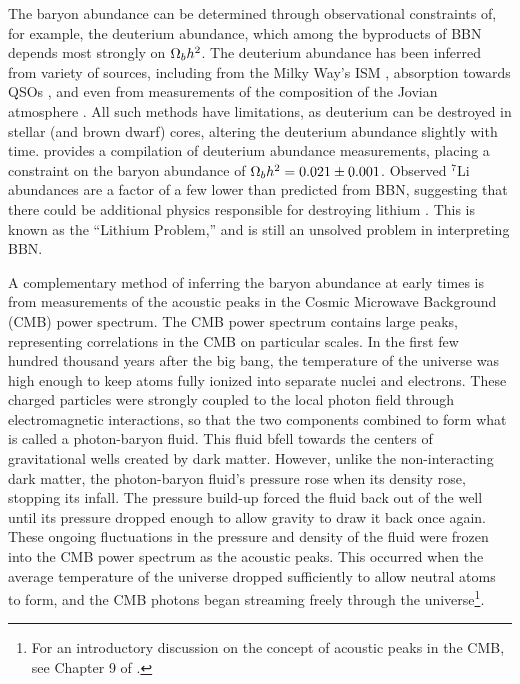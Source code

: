 

The baryon abundance can be determined through observational
constraints of, for example, the deuterium abundance, which among the
byproducts of BBN depends most strongly on $\Omega_b h^2$. The
deuterium abundance has been inferred from variety of sources,
including from the Milky Way's ISM \citep{Linsky1993, Linsky1995},
absorption towards QSOs \citep{Tytler1996, Kirkman2003}, and even from
measurements of the composition of the Jovian atmosphere
\citep{Niemann1996}. All such methods have limitations, as deuterium
can be destroyed in stellar (and brown dwarf) cores, altering the
deuterium abundance slightly with time. \citet{Iocco2009} provides a
compilation of deuterium abundance measurements, placing a
constraint on the baryon abundance of $\Omega_b h^2 = 0.021 \pm
0.001$. Observed $^7$Li abundances are a factor of a few lower than
predicted from BBN, suggesting that there could be additional physics
responsible for destroying lithium \citep{Suzuki2000,
  Melendez2004}. This is known as the ``Lithium Problem,'' and is
still an unsolved problem in interpreting BBN.

A complementary method of inferring the baryon abundance at early
times is from measurements of the acoustic peaks in the Cosmic
Microwave Background (CMB) power spectrum. The CMB power spectrum
contains large peaks, representing correlations in the CMB on
particular scales. In the first few hundred thousand years after the
big bang, the temperature of the universe was high enough to keep
atoms fully ionized into separate nuclei and electrons. These charged
particles were strongly coupled to the local photon field through
electromagnetic interactions, so that the two components combined to
form what is called a photon-baryon fluid. This fluid bfell towards the
centers of gravitational wells created by dark matter. However, unlike
the non-interacting dark matter, the photon-baryon fluid's pressure
rose when its density rose, stopping its infall. The pressure build-up
forced the fluid back out of the well until its pressure dropped
enough to allow gravity to draw it back once again. These ongoing
fluctuations in the pressure and density of the fluid were frozen into
the CMB power spectrum as the acoustic peaks. This occurred when the
average temperature of the universe dropped sufficiently to allow
neutral atoms to form, and the CMB photons began streaming freely
through the universe\footnote{For an introductory discussion on the
  concept of acoustic peaks in the CMB, see Chapter 9 of
  \citet{Ryden2003}.}.

